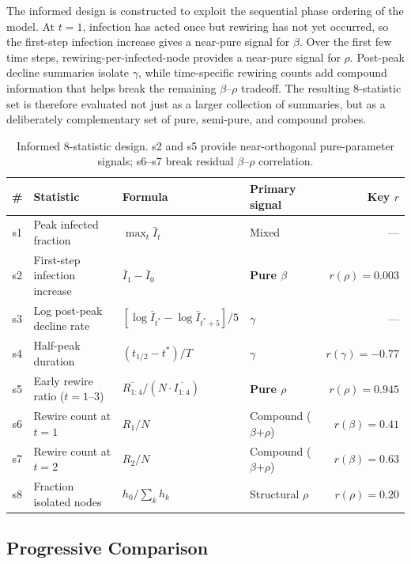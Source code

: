\documentclass[12pt]{article}
\begin{document}
The informed design is constructed to exploit the sequential phase ordering \cite{GDB06} of the model. At $t=1$, infection has acted once but rewiring has not yet occurred, so the first-step infection increase gives a near-pure signal for $\beta$. Over the first few time steps, rewiring-per-infected-node provides a near-pure signal for $\rho$. Post-peak decline summaries isolate $\gamma$, while time-specific rewiring counts add compound information that helps break the remaining $\beta$--$\rho$ tradeoff. The resulting 8-statistic set is therefore evaluated not just as a larger collection of summaries, but as a deliberately complementary set of pure, semi-pure, and compound probes.

\begin{table}[h]
\centering
\small
\begin{tabular}{c p{3.4cm} p{4.0cm} p{2.8cm} r}
\toprule
\# & \textbf{Statistic} & \textbf{Formula} & \textbf{Primary signal} & \textbf{Key $r$} \\
\midrule
s1 & Peak infected fraction & $\max_t \bar{I}_t$ & Mixed & --- \\
s2 & First-step infection increase & $\bar{I}_1 - \bar{I}_0$ & \textbf{Pure $\beta$} & $r(\rho)=0.003$ \\
s3 & Log post-peak decline rate & $[\log \bar{I}_{t^*} - \log \bar{I}_{t^*+5}]/5$ & $\gamma$ & --- \\
s4 & Half-peak duration & $(t_{1/2} - t^*)/T$ & $\gamma$ & $r(\gamma)=-0.77$ \\
s5 & Early rewire ratio ($t=1$--$3$) & $\overline{R_{1:4}}/(N \cdot \overline{I_{1:4}})$ & \textbf{Pure $\rho$} & $r(\rho)=0.945$ \\
s6 & Rewire count at $t=1$ & $R_1/N$ & Compound ($\beta$+$\rho$) & $r(\beta)=0.41$ \\
s7 & Rewire count at $t=2$ & $R_2/N$ & Compound ($\beta$+$\rho$) & $r(\beta)=0.63$ \\
s8 & Fraction isolated nodes & $h_0/\sum_k h_k$ & Structural $\rho$ & $r(\rho)=0.20$ \\
\bottomrule
\end{tabular}
\caption{Informed 8-statistic design. s2 and s5 provide near-orthogonal pure-parameter signals; s6--s7 break residual $\beta$--$\rho$ correlation.}
\end{table}


\subsection{Progressive Comparison}
\end{document}
